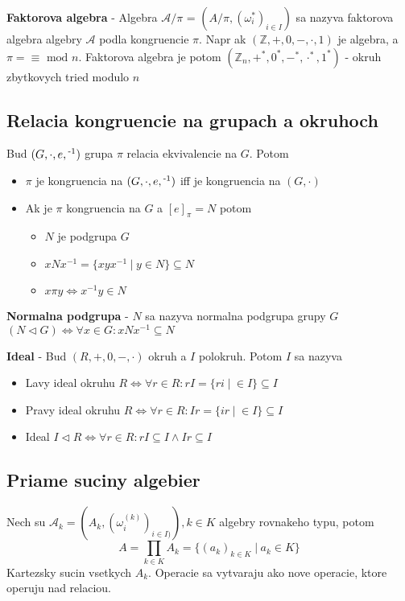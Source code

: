 \documentclass[12pt]{article}
\newcommand{\pipesep}{\hspace{3pt} \vert \hspace{3pt}}
\begin{document}
\textbf{Faktorova algebra} - Algebra $\mathcal{A}/\pi$ = $(A/\pi,(\omega^{*}_{i})_{i \in I})$ sa nazyva faktorova algebra
algebry $\mathcal{A}$ podla kongruencie $\pi$. Napr ak $(\mathbb{Z},+,0,-,\cdot,1)$ je algebra, a $\pi = \equiv\text{ mod }n$.
Faktorova algebra je potom $(\mathbb{Z}_{n},+^{*},0^{*},-^{*},\cdot^{*},1^{*})$ - okruh zbytkovych tried modulo $n$

\subsection{Relacia kongruencie na grupach a okruhoch}
Bud $(G,\cdot,e,\textsuperscript{-1})$ grupa $\pi$ relacia ekvivalencie na $G$. Potom
\begin{itemize}
	\item $\pi$ je kongruencia na $(G,\cdot,e,\textsuperscript{-1})$ iff je kongruencia na $(G,\cdot)$
	\item Ak je $\pi$ kongruencia na $G$ a $[e]_{\pi} = N$ potom
	\begin{itemize}
		\item $N$ je podgrupa $G$
		\item $xNx^{-1} = \{xyx^{-1} \pipesep y \in N\} \subseteq N$
		\item $x\pi y \Leftrightarrow x^{-1}y \in N$
	\end{itemize}
\end{itemize}
\textbf{Normalna podgrupa} - $N$ sa nazyva normalna podgrupa grupy $G$ $(N \lhd G) \Leftrightarrow
	\forall x \in G: xNx^{-1} \subseteq N$

	\textbf{Ideal} - Bud $(R,+,0,-,\cdot)$ okruh a $I$ polokruh. Potom $I$ sa nazyva
\begin{itemize}
	\item Lavy ideal okruhu $R \Leftrightarrow \forall r \in R: rI = \{ ri \pipesep \in I\}
		\subseteq I$
	\item Pravy ideal okruhu $R \Leftrightarrow \forall r \in R: Ir = \{ ir \pipesep \in I\}
		\subseteq I$
	\item Ideal $I \lhd R \Leftrightarrow \forall r \in R: rI \subseteq I \land Ir \subseteq I$
\end{itemize}

\subsection{Priame suciny algebier}
Nech su $\mathcal{A}_{k} = (A_{k}, (\omega^{(k)}_{i})_{i \in I)}), k \in K$ algebry rovnakeho typu, potom
\begin{equation*}
	A = \displaystyle\prod_{k \in K} A_{k} = \{(a_{k})_{k \in K} \pipesep a_{k} \in K\}
\end{equation*}
Kartezsky sucin vsetkych $A_{k}$. Operacie sa vytvaraju ako nove operacie, ktore operuju nad relaciou.
\end{document}
